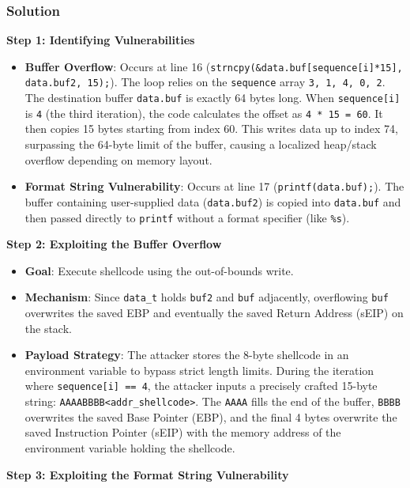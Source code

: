 \documentclass{article}
\begin{document}
\subsubsection*{Solution}
\textbf{Step 1: Identifying Vulnerabilities}
\begin{itemize}
    \item[\textbf{1.}] \textbf{Buffer Overflow}: Occurs at line 16 (\texttt{strncpy(\&data.buf[sequence[i]*15], data.buf2, 15);}). The loop relies on the \texttt{sequence} array \texttt{{3, 1, 4, 0, 2}}. The destination buffer \texttt{data.buf} is exactly 64 bytes long. When \texttt{sequence[i]} is \texttt{4} (the third iteration), the code calculates the offset as \texttt{4 * 15 = 60}. It then copies 15 bytes starting from index 60. This writes data up to index 74, surpassing the 64-byte limit of the buffer, causing a localized heap/stack overflow depending on memory layout.
    \item[\textbf{2.}] \textbf{Format String Vulnerability}: Occurs at line 17 (\texttt{printf(data.buf);}). The buffer containing user-supplied data (\texttt{data.buf2}) is copied into \texttt{data.buf} and then passed directly to \texttt{printf} without a format specifier (like \texttt{\%s}).

\end{itemize}
\textbf{Step 2: Exploiting the Buffer Overflow}
\begin{itemize}
    \item \textbf{Goal}: Execute shellcode using the out-of-bounds write.
    \item \textbf{Mechanism}: Since \texttt{data\_t} holds \texttt{buf2} and \texttt{buf} adjacently, overflowing \texttt{buf} overwrites the saved EBP and eventually the saved Return Address (sEIP) on the stack.
    \item \textbf{Payload Strategy}: The attacker stores the 8-byte shellcode in an environment variable to bypass strict length limits. During the iteration where \texttt{sequence[i] == 4}, the attacker inputs a precisely crafted 15-byte string: \texttt{AAAABBBB<addr\_shellcode>}. The \texttt{AAAA} fills the end of the buffer, \texttt{BBBB} overwrites the saved Base Pointer (EBP), and the final 4 bytes overwrite the saved Instruction Pointer (sEIP) with the memory address of the environment variable holding the shellcode.

\end{itemize}
\textbf{Step 3: Exploiting the Format String Vulnerability}
\end{document}

